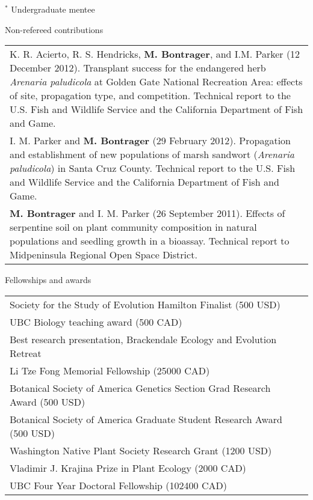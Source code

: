 \documentclass[letterpaper,11pt,oneside]{article}
\begin{document}
\smallskip
\noindent $^{*}$ Undergraduate mentee
\egroup

\bigskip
\bigskip


\bgroup
\noindent\Large{Non-refereed contributions}  
\normalsize
\bigskip

\def\arraystretch{1.2}
\noindent \begin{tabular}{@{} >{\raggedright\arraybackslash}p{16.11cm}}
K. R. Acierto, R. S. Hendricks, \textbf{M. Bontrager}, and I.M. Parker (12 December 2012). Transplant success for the endangered herb \textit{Arenaria paludicola} at Golden Gate National Recreation Area: effects of site, propagation type, and competition. Technical report to the U.S. Fish and Wildlife Service and the California Department of Fish and Game. \\
I. M. Parker and \textbf{M. Bontrager} (29 February 2012). Propagation and establishment of new populations of marsh sandwort (\textit{Arenaria paludicola}) in Santa Cruz County. Technical report to the U.S. Fish and Wildlife Service and the California Department of Fish and Game. \\
\textbf{M. Bontrager} and I. M. Parker (26 September 2011). Effects of serpentine soil on plant community composition in natural populations and seedling growth in a bioassay. Technical report to Midpeninsula Regional Open Space District. \\
\end{tabular}
\egroup
\bigskip

\newpage




\bgroup
\noindent\Large{Fellowships and awards}
\bigskip

\normalsize
\noindent \begin{tabular}{@{} >{\raggedright\arraybackslash}p{14.91cm} >{\raggedleft\arraybackslash}p{1.2cm}}
Society for the Study of Evolution Hamilton Finalist (500 USD) & 2019 \\ 
UBC Biology teaching award (500 CAD) & 2018 \\
Best research presentation, Brackendale Ecology and Evolution Retreat & 2016 \\
Li Tze Fong Memorial Fellowship (25000 CAD) & 2016 \\
Botanical Society of America Genetics Section Grad Research Award (500 USD) & 2016 \\
Botanical Society of America Graduate Student Research Award (500 USD) & 2016 \\
Washington Native Plant Society Research Grant (1200 USD) & 2016 \\
Vladimir J. Krajina Prize in Plant Ecology (2000 CAD) & 2013 \\
UBC Four Year Doctoral Fellowship (102400 CAD) & 2012 \\
\end{tabular}
\egroup
\bigskip
 
\end{document}
